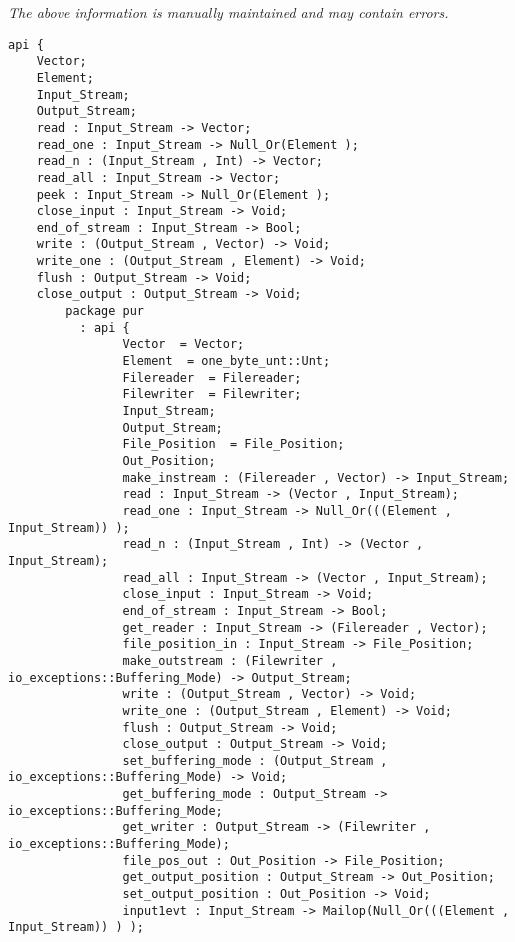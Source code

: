 \label{api:Winix\_Data\_File\_For\_Os}

{\tiny \it The above information is manually maintained and may contain errors.}
\begin{verbatim}
api {
    Vector;
    Element;
    Input_Stream;
    Output_Stream;
    read : Input_Stream -> Vector;
    read_one : Input_Stream -> Null_Or(Element );
    read_n : (Input_Stream , Int) -> Vector;
    read_all : Input_Stream -> Vector;
    peek : Input_Stream -> Null_Or(Element );
    close_input : Input_Stream -> Void;
    end_of_stream : Input_Stream -> Bool;
    write : (Output_Stream , Vector) -> Void;
    write_one : (Output_Stream , Element) -> Void;
    flush : Output_Stream -> Void;
    close_output : Output_Stream -> Void;
        package pur
          : api {
                Vector  = Vector;
                Element  = one_byte_unt::Unt;
                Filereader  = Filereader;
                Filewriter  = Filewriter;
                Input_Stream;
                Output_Stream;
                File_Position  = File_Position;
                Out_Position;
                make_instream : (Filereader , Vector) -> Input_Stream;
                read : Input_Stream -> (Vector , Input_Stream);
                read_one : Input_Stream -> Null_Or(((Element , Input_Stream)) );
                read_n : (Input_Stream , Int) -> (Vector , Input_Stream);
                read_all : Input_Stream -> (Vector , Input_Stream);
                close_input : Input_Stream -> Void;
                end_of_stream : Input_Stream -> Bool;
                get_reader : Input_Stream -> (Filereader , Vector);
                file_position_in : Input_Stream -> File_Position;
                make_outstream : (Filewriter , io_exceptions::Buffering_Mode) -> Output_Stream;
                write : (Output_Stream , Vector) -> Void;
                write_one : (Output_Stream , Element) -> Void;
                flush : Output_Stream -> Void;
                close_output : Output_Stream -> Void;
                set_buffering_mode : (Output_Stream , io_exceptions::Buffering_Mode) -> Void;
                get_buffering_mode : Output_Stream -> io_exceptions::Buffering_Mode;
                get_writer : Output_Stream -> (Filewriter , io_exceptions::Buffering_Mode);
                file_pos_out : Out_Position -> File_Position;
                get_output_position : Output_Stream -> Out_Position;
                set_output_position : Out_Position -> Void;
                input1evt : Input_Stream -> Mailop(Null_Or(((Element , Input_Stream)) ) );

\end{verbatim}
